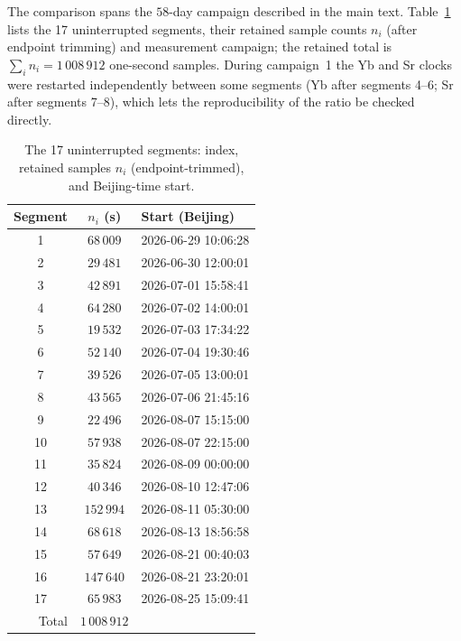 \documentclass[11pt,a4paper]{article}
\begin{document}
The comparison spans the $58$-day campaign described in the main text.
Table~\ref{tab:segments} lists the 17 uninterrupted segments, their
retained sample counts $n_i$ (after endpoint trimming) and measurement
campaign; the retained total is $\sum_i n_i = 1\,008\,912$ one-second
samples. During campaign~1 the Yb and Sr clocks were restarted
independently between some segments (Yb after segments 4--6; Sr after
segments 7--8), which lets the reproducibility of the ratio be checked
directly.

\begin{table}[t]
  \centering
  \caption{The 17 uninterrupted segments: index, retained samples $n_i$
  (endpoint-trimmed), and Beijing-time start.}
  \label{tab:segments}
  \begin{tabular}{ccl}
    \toprule
    Segment & $n_i$ (s) & Start (Beijing) \\
    \midrule
    1  & $68\,009$  & 2026-06-29 10:06:28 \\
    2  & $29\,481$  & 2026-06-30 12:00:01 \\
    3  & $42\,891$  & 2026-07-01 15:58:41 \\
    4  & $64\,280$  & 2026-07-02 14:00:01 \\
    5  & $19\,532$  & 2026-07-03 17:34:22 \\
    6  & $52\,140$  & 2026-07-04 19:30:46 \\
    7  & $39\,526$  & 2026-07-05 13:00:01 \\
    8  & $43\,565$  & 2026-07-06 21:45:16 \\
    9  & $22\,496$  & 2026-08-07 15:15:00 \\
    10 & $57\,938$  & 2026-08-07 22:15:00 \\
    11 & $35\,824$  & 2026-08-09 00:00:00 \\
    12 & $40\,346$  & 2026-08-10 12:47:06 \\
    13 & $152\,994$ & 2026-08-11 05:30:00 \\
    14 & $68\,618$  & 2026-08-13 18:56:58 \\
    15 & $57\,649$  & 2026-08-21 00:40:03 \\
    16 & $147\,640$ & 2026-08-21 23:20:01 \\
    17 & $65\,983$  & 2026-08-25 15:09:41 \\
    \midrule
    \multicolumn{1}{r}{Total} & $1\,008\,912$ & \\
    \bottomrule
  \end{tabular}
\end{table}
\end{document}

